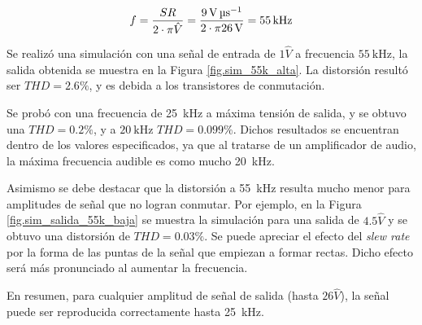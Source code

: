 \begin{equation}
	\centering
	f = \frac{SR}{2 \cdot \pi \hat{V} } = \frac{\SI{9}{\volt\per\micro\second}}{2 \cdot \pi \SI{26}{\volt}} = \SI{55}{\kilo\hertz}
	\label{ec.max_f}
\end{equation}

Se realizó una simulación con una señal de entrada de $1 \hat{V}$ a frecuencia $\SI{55}{\kilo\hertz}$, la salida obtenida se muestra en la Figura \ref{fig.sim_55k_alta}. La distorsión resultó ser $THD = \num{2.6}\%$, y es debida a los transistores de conmutación. 


	Se probó con una frecuencia de \SI{25}{\kilo\hertz} a máxima tensión de salida, y se obtuvo una $THD=\num{0.2}\%$, y a $\SI{20}{\kilo\hertz}$ $THD=\num{0.099}\%$. Dichos resultados se encuentran dentro de los valores especificados, ya que al tratarse de un amplificador de audio, la máxima frecuencia audible es como mucho \SI{20}{\kilo\hertz}.



Asimismo se debe destacar que la distorsión a \SI{55}{\kilo\hertz} resulta mucho menor para amplitudes de señal que no logran conmutar. Por ejemplo, en la Figura \ref{fig.sim_salida_55k_baja} se muestra la simulación para una salida de $\num{4.5}\hat{V}$ y se obtuvo una distorsión de $THD=\num{0.03}\%$. Se puede apreciar el efecto del \textit{slew rate} por la forma de las puntas de la señal que empiezan a formar rectas. Dicho efecto será más pronunciado al aumentar la frecuencia.



En resumen, para cualquier amplitud de señal de salida (hasta $26\hat{V}$), la señal puede ser reproducida correctamente hasta \SI{25}{\kilo\hertz}.

